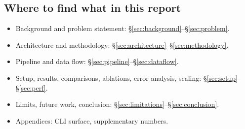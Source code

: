 \subsection{Where to find what in this report}

\begin{itemize}
  \item Background and problem statement:
        \S\ref{sec:background}--\S\ref{sec:problem}.
  \item Architecture and methodology:
        \S\ref{sec:architecture}--\S\ref{sec:methodology}.
  \item Pipeline and data flow:
        \S\ref{sec:pipeline}--\S\ref{sec:dataflow}.
  \item Setup, results, comparisons, ablations, error analysis,
        scaling:
        \S\ref{sec:setup}--\S\ref{sec:perf}.
  \item Limits, future work, conclusion:
        \S\ref{sec:limitations}--\S\ref{sec:conclusion}.
  \item Appendices: CLI surface, supplementary numbers.
\end{itemize}

